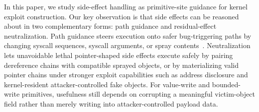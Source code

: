










In this paper, we study side-effect handling as primitive-site guidance for kernel exploit construction. Our key observation is that side effects can be reasoned about in two complementary forms: path guidance and residual-effect neutralization. Path guidance steers execution onto safer bug-triggering paths by changing syscall sequences, syscall arguments, or spray contents~\cite{lin2022grebe,zou2022syzscope}. Neutralization lets unavoidable lethal pointer-shaped side effects execute safely by pairing dereference chains with compatible sprayed objects, or by materializing valid pointer chains under stronger exploit capabilities such as address disclosure and kernel-resident attacker-controlled fake objects. For value-write and bounded-write primitives, usefulness still depends on corrupting a meaningful victim-object field rather than merely writing into attacker-controlled payload data.

